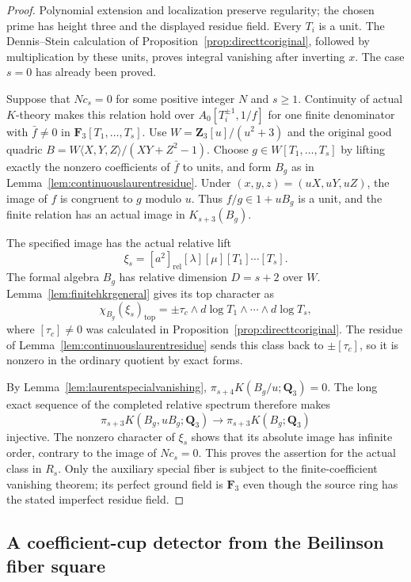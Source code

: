 \documentclass[11pt,a4paper]{article}
\theoremstyle{remark}
\newcommand{\Q}{\mathbf Q}
\newcommand{\Z}{\mathbf Z}
\newcommand{\F}{\mathbf F}
\begin{document}
\begin{proof}
Polynomial extension and localization preserve regularity; the
chosen prime has height three and the displayed residue field.
Every $T_i$ is a unit. The Dennis--Stein calculation of
Proposition~\ref{prop:directtcoriginal}, followed by multiplication
by these units, proves integral vanishing after inverting $x$.
The case $s=0$ has already been proved.

Suppose that $N c_s=0$ for some positive integer $N$ and $s\geq1$.
Continuity of actual $K$-theory makes this relation hold over
$A_0[T_i^{\pm1},1/f]$ for one finite denominator with
$\bar f\ne0$ in $\F_3[T_1,\ldots,T_s]$.
Use $W=\Z_3[u]/(u^2+3)$ and the original good quadric
$B=W\langle X,Y,Z\rangle/(XY+Z^2-1)$.
Choose $g\in W[T_1,\ldots,T_s]$ by lifting exactly the nonzero
coefficients of $\bar f$ to units, and form $B_g$ as in
Lemma~\ref{lem:continuouslaurentresidue}.
Under $(x,y,z)=(uX,uY,uZ)$, the image of $f$ is congruent to $g$
modulo $u$. Thus $f/g\in1+uB_g$ is a unit, and the finite
relation has an actual image in $K_{s+3}(B_g)$.

The specified image has the actual relative lift
\[
 \xi_s=[a^2]_{\mathrm{rel}}[\lambda][\mu]
                                  [T_1]\cdots[T_s].
\]
The formal algebra $B_g$ has relative dimension $D=s+2$ over $W$.
Lemma~\ref{lem:finitehkrgeneral} gives its top character as
\[
 \chi_{B_g}(\xi_s)_{\mathrm{top}}
       =\pm\tau_c\wedge d\log T_1\wedge\cdots\wedge d\log T_s,
\]
where $[\tau_c]\ne0$ was calculated in
Proposition~\ref{prop:directtcoriginal}.
The residue of Lemma~\ref{lem:continuouslaurentresidue} sends this
class back to $\pm[\tau_c]$, so it is nonzero in the ordinary
quotient by exact forms.

By Lemma~\ref{lem:laurentspecialvanishing},
$\pi_{s+4}K(B_g/u;\Q_3)=0$. The long exact sequence of the
completed relative spectrum therefore makes
\[
 \pi_{s+3}K(B_g,uB_g;\Q_3)
       \longrightarrow\pi_{s+3}K(B_g;\Q_3)
\]
injective. The nonzero character of $\xi_s$ shows that its absolute
image has infinite order, contrary to the image of $Nc_s=0$.
This proves the assertion for the actual class in $R_s$.
Only the auxiliary special fiber is subject to the finite-coefficient
vanishing theorem; its perfect ground field is $\F_3$ even though
the source ring has the stated imperfect residue field.
\end{proof}


\subsection{A coefficient-cup detector from the Beilinson fiber square}
\label{sec:directtccoefficients}
\end{document}
